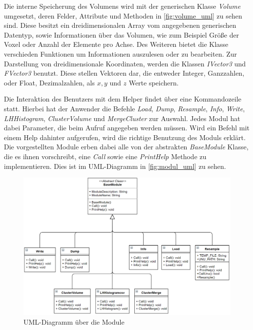 Die interne Speicherung des Volumens wird mit der generischen Klasse \textit{Volume} umgesetzt, deren Felder, Attribute und Methoden in \autoref{fig:volume_uml} zu sehen sind. Diese besitzt ein dreidimensionalen Array vom angegebenen generischen Datentyp, sowie Informationen über das Volumen, wie zum Beispiel Größe der Voxel oder Anzahl der Elemente pro Achse. Des Weiteren bietet die Klasse verschieden Funktionen um Informationen auszulesen oder zu bearbeiten. Zur Darstellung von dreidimensionale Koordinaten, werden die Klassen \textit{IVector3} und \textit{FVector3} benutzt. Diese stellen Vektoren dar, die entweder Integer, Ganzzahlen, oder Float, Dezimalzahlen, als $x,y$ und $z$ Werte speichern.


Die Interaktion des Benutzers mit dem Helper findet über eine Kommandozeile statt. Hierbei hat der Anwender die Befehle \textit{Load}, \textit{Dump}, \textit{Resample}, \textit{Info}, \textit{Write}, \textit{LHHistogram}, \textit{ClusterVolume} und \textit{MergeCluster} zur Auswahl. Jedes Modul hat dabei Parameter, die beim Aufruf angegeben werden müssen. Wird ein Befehl mit einem Help dahinter aufgerufen, wird die richtige Benutzung des Moduls erklärt.
\newline
Die vorgestellten Module erben dabei alle von der abstrakten \textit{BaseModule} Klasse, die es ihnen vorschreibt, eine \textit{Call} sowie eine \textit{PrintHelp} Methode zu implementieren. Dies ist im UML-Diagramm in \autoref{fig:modul_uml} zu sehen.


\begin{figure}
\centering 
\includegraphics[width=\textwidth]{Logos/Modules_UML.PNG}
\caption{UML-Diagramm über die Module} 
\label{fig:modul_uml} 
\end{figure}


